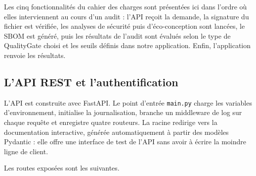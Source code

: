 \documentclass[a4paper,12pt]{article}
\begin{document}
\vspace{-0.1cm}

Les cinq fonctionnalités du cahier des charges sont présentées ici dans
l'ordre où elles interviennent au cours d'un audit : l'API reçoit la
demande, la signature du fichier est vérifiée, les analyses de sécurité
puis d'éco-conception sont lancées, le SBOM est généré, puis les
résultats de l'audit sont évalués selon le type de QualityGate choisi et
les seuils définis dans notre application. Enfin, l'application renvoie
les résultats.

\subsection{L'API REST et
l'authentification}\label{lapi-rest-et-lauthentification}

L'API est construite avec FastAPI. Le point d'entrée \texttt{main.py}
charge les variables d'environnement, initialise la journalisation,
branche un middleware de log sur chaque requête et enregistre quatre
routeurs. La racine redirige vers la documentation interactive, générée
automatiquement à partir des modèles Pydantic : elle offre une interface
de test de l'API sans avoir à écrire la moindre ligne de client.

Les routes exposées sont les suivantes.
\end{document}
